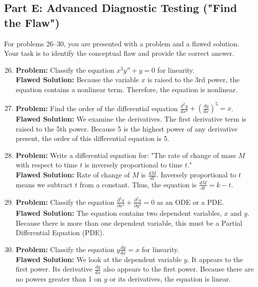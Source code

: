 \documentclass{article}
\begin{document}
\subsection*{Part E: Advanced Diagnostic Testing ("Find the Flaw")}
For problems 26--30, you are presented with a problem and a flawed solution. Your task is to identify the conceptual flaw and provide the correct answer.

\begin{enumerate}
    \setcounter{enumi}{25}
    \item \textbf{Problem:} Classify the equation $x^3 y'' + y = 0$ for linearity. \\
    \textbf{Flawed Solution:} Because the variable $x$ is raised to the 3rd power, the equation contains a nonlinear term. Therefore, the equation is nonlinear.
    
    \item \textbf{Problem:} Find the order of the differential equation $\frac{d^2 y}{dx^2} + \left(\frac{dy}{dx}\right)^5 = x$. \\
    \textbf{Flawed Solution:} We examine the derivatives. The first derivative term is raised to the 5th power. Because 5 is the highest power of any derivative present, the order of this differential equation is 5.
    
    \item \textbf{Problem:} Write a differential equation for: "The rate of change of mass $M$ with respect to time $t$ is inversely proportional to time $t$." \\
    \textbf{Flawed Solution:} Rate of change of $M$ is $\frac{dM}{dt}$. Inversely proportional to $t$ means we subtract $t$ from a constant. Thus, the equation is $\frac{dM}{dt} = k - t$.
    
    \item \textbf{Problem:} Classify the equation $\frac{\partial^2 u}{\partial x^2} + \frac{\partial^2 u}{\partial y^2} = 0$ as an ODE or a PDE. \\
    \textbf{Flawed Solution:} The equation contains two dependent variables, $x$ and $y$. Because there is more than one dependent variable, this must be a Partial Differential Equation (PDE).
    
    \item \textbf{Problem:} Classify the equation $y \frac{dy}{dx} = x$ for linearity. \\
    \textbf{Flawed Solution:} We look at the dependent variable $y$. It appears to the first power. Its derivative $\frac{dy}{dx}$ also appears to the first power. Because there are no powers greater than 1 on $y$ or its derivatives, the equation is linear.
\end{enumerate}
\end{document}
